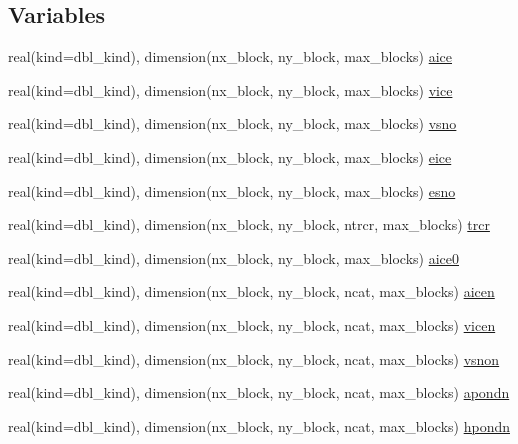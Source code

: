\subsection*{Variables}
\begin{DoxyCompactItemize}
\item 
real(kind=dbl\_\-kind), dimension(nx\_\-block, ny\_\-block, max\_\-blocks) \hyperlink{namespaceice__state_a91eaa8dd8287c9640310a0aec0a85df8}{aice}
\item 
real(kind=dbl\_\-kind), dimension(nx\_\-block, ny\_\-block, max\_\-blocks) \hyperlink{namespaceice__state_a097435b3544c01705ca626cc43ee61b5}{vice}
\item 
real(kind=dbl\_\-kind), dimension(nx\_\-block, ny\_\-block, max\_\-blocks) \hyperlink{namespaceice__state_ac2427022070069eb40ad5d21ad7a684e}{vsno}
\item 
real(kind=dbl\_\-kind), dimension(nx\_\-block, ny\_\-block, max\_\-blocks) \hyperlink{namespaceice__state_aa30edd78b7a6855c7bfabf428b93f355}{eice}
\item 
real(kind=dbl\_\-kind), dimension(nx\_\-block, ny\_\-block, max\_\-blocks) \hyperlink{namespaceice__state_af4c38f6f98fdc5516cde3066120a0074}{esno}
\item 
real(kind=dbl\_\-kind), dimension(nx\_\-block, ny\_\-block, ntrcr, max\_\-blocks) \hyperlink{namespaceice__state_ad9117b5d7f02ca8a6a10db8afa75a6ef}{trcr}
\item 
real(kind=dbl\_\-kind), dimension(nx\_\-block, ny\_\-block, max\_\-blocks) \hyperlink{namespaceice__state_aabb208bcf122d73e3975ab376d190703}{aice0}
\item 
real(kind=dbl\_\-kind), dimension(nx\_\-block, ny\_\-block, ncat, max\_\-blocks) \hyperlink{namespaceice__state_a38df7a3870d9a3a425b31808503ba98e}{aicen}
\item 
real(kind=dbl\_\-kind), dimension(nx\_\-block, ny\_\-block, ncat, max\_\-blocks) \hyperlink{namespaceice__state_aa85616e03769af4afb0166070aa7cc8f}{vicen}
\item 
real(kind=dbl\_\-kind), dimension(nx\_\-block, ny\_\-block, ncat, max\_\-blocks) \hyperlink{namespaceice__state_acd313a058964928092cbc75f7689cef5}{vsnon}
\item 
real(kind=dbl\_\-kind), dimension(nx\_\-block, ny\_\-block, ncat, max\_\-blocks) \hyperlink{namespaceice__state_aa2d9beee38aa0717dea2399d060d236d}{apondn}
\item 
real(kind=dbl\_\-kind), dimension(nx\_\-block, ny\_\-block, ncat, max\_\-blocks) \hyperlink{namespaceice__state_aa0ef224575214fdcb3ea6ccc63645a2d}{hpondn}

\end{DoxyCompactItemize}
